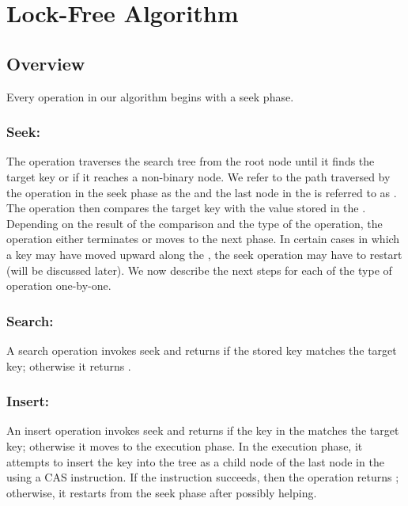 \section{Lock-Free Algorithm}
\subsection{Overview}
Every operation in our algorithm begins with a seek phase. 
\subsubsection{Seek:} The operation traverses the search tree from the root node until it finds the target key or if it reaches a non-binary node. We refer to the path traversed by the operation in the seek phase as the \accesspath \space and the last node in the \accesspath \space is referred to as \terminalnode. The operation then compares the target key with the value stored in the \terminalnode. Depending on the result of the comparison and the type of the operation, the operation either terminates or moves to the next phase. In certain cases in which a key may have moved upward along the \accesspath, the seek operation may have to restart (will be discussed later). We now describe the next steps for each of the type of operation one-by-one.
\subsubsection{Search:} A search operation invokes seek and returns \True \space if the stored key matches the target key; otherwise it returns \False.
\subsubsection{Insert:} An insert operation invokes seek and returns \False \space if the key in the \terminalnode \space matches the target key; otherwise it moves to the execution phase. In the execution phase, it attempts to insert the key into the tree as a child node of the last node in the \accesspath \space using a CAS instruction. If the instruction succeeds, then the operation returns \True; otherwise, it restarts from the seek phase after possibly helping.
